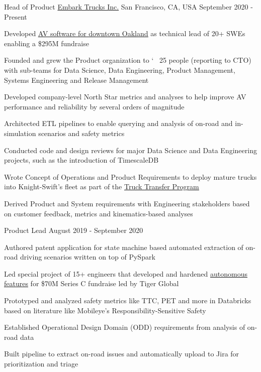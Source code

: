 \begin{center}
  \vspace{-1mm}
  \cventry
    {Head of Product}
    {\href{https://embarktrucks.com}{Embark Trucks Inc.}}
    {San Francisco, CA, USA}
    {September 2020 - Present}
    {
      \begin{cvitems}
        \item {Developed \href{https://www.youtube.com/watch?v=6-02xycYbws}{\underline{AV software for downtown Oakland}} as technical lead of 20+ SWEs enabling a \$295M fundraise}
        \item {Founded and grew the Product organization to \char`~ 25 people (reporting to CTO) with sub-teams for Data Science, Data Engineering, Product Management, Systems Engineering and Release Management}
        \item {Developed company-level North Star metrics and analyses to help improve AV performance and reliability by several orders of magnitude}
        \item {Architected ETL pipelines to enable querying and analysis of on-road and in-simulation scenarios and safety metrics}
        \item {Conducted code and design reviews for major Data Science and Data Engineering projects, such as the introduction of TimescaleDB}
        \item {Wrote Concept of Operations and Product Requirements to deploy mature trucks into Knight-Swift's fleet as part of the \href{https://www.youtube.com/watch?v=CBnEjgEuQuA}{\underline{Truck Transfer Program}}}
        \item {Derived Product and System requirements with Engineering stakeholders based on customer feedback, metrics and kinematics-based analyses}
      \end{cvitems} 
    }
\end{center}
\begin{center}
  \cvsubentry
    {Product Lead}
    {August 2019 - September 2020}
    {
      \begin{cvitems}
        \item {Authored patent application for state machine based automated extraction of on-road driving scenarios written on top of PySpark}
        \item {Led special project of 15+ engineers that developed and hardened \href{https://www.youtube.com/watch?v=llAQyawBau0}{\underline{autonomous features}} for \$70M Series C fundraise led by Tiger Global}
        \item {Prototyped and analyzed safety metrics like TTC, PET and more in Databricks based on literature like Mobileye's Responsibility-Sensitive Safety}
        \item {Established Operational Design Domain (ODD) requirements from analysis of on-road data}
        \item {Built pipeline to extract on-road issues and automatically upload to Jira for prioritization and triage}
      \end{cvitems} 
    }
\end{center}
